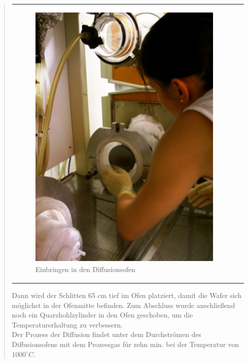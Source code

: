 \begin{quote}
\begin{center}
\begin{tabular}{ll}
\begin{minipage}{0.75\textwidth}
                        \begin{figure}[H]
                        \hspace{8em}
                            \includegraphics[scale=0.7, trim = 0cm 0cm 0cm
                            0cm, clip]
                            {./HerstellungBilder/einbringeninDiffusionsofen.png}
                            \caption{Einbringen in den Diffusionsofen}
                           \label{fig:ein_diff}
                        \end{figure}
                    \vspace{-1.5em}

                    \end{minipage}

                \end{tabular}
		\end{center}

		\vspace{2em}

		Dann wird der Schlitten 65 cm tief im Ofen platziert, damit die Wafer
		sich möglichst in der Ofenmitte befinden. Zum Abschluss wurde
		anschließend noch ein Quarzhohlzylinder in den Ofen geschoben, um die
		Temperaturerhaltung zu verbessern.\\
		Der Prozess der Diffusion findet unter dem Durchströmen des
		Diffusionsofens mit dem Prozessgas für zehn min. bei der Temperatur von
		$1000 ^{\circ}C$.


\end{quote}
